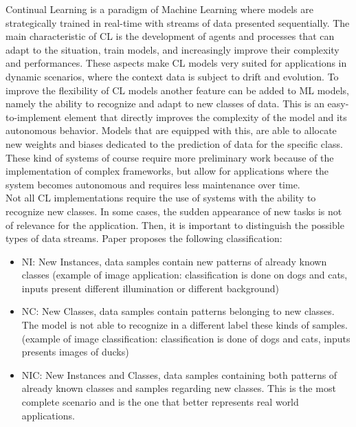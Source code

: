 \documentclass[12pt]{report}
\begin{document}
Continual Learning is a paradigm of Machine Learning where models are strategically trained in real-time with streams of data presented sequentially. The main characteristic of CL is the development of agents and processes that can adapt to the situation, train models, and increasingly improve their complexity and performances. These aspects make CL models very suited for applications in dynamic scenarios, where the context data is subject to drift and evolution. To improve the flexibility of CL models another feature can be added to ML models, namely the ability to recognize and adapt to new classes of data. This is an easy-to-implement element that directly improves the complexity of the model and its autonomous behavior. Models that are equipped with this, are able to allocate new weights and biases dedicated to the prediction of data for the specific class. These kind of systems of course require more preliminary work because of the implementation of complex frameworks, but allow for applications where the system becomes autonomous and requires less maintenance over time. \\
Not all CL implementations require the use of systems with the ability to recognize new classes. In some cases, the sudden appearance of new tasks is not of relevance for the application. Then, it is important to distinguish the possible types of data streams. Paper \cite{maltoni2019continuous} proposes the following classification:\\

\begin{itemize}
\item NI: New Instances, data samples contain new patterns of already known classes (example of image application: classification is done on dogs and cats, inputs present different illumination or different background)
\item NC: New Classes, data samples contain patterns belonging to new classes. The model is not able to recognize in a different label these kinds of samples. (example of image classification: classification is done of dogs and cats, inputs presents images of ducks)
\item NIC: New Instances and Classes, data samples containing both patterns of already known classes and samples regarding new classes. This is the most complete scenario and is the one that better represents real world applications.
\end{itemize}
\end{document}
